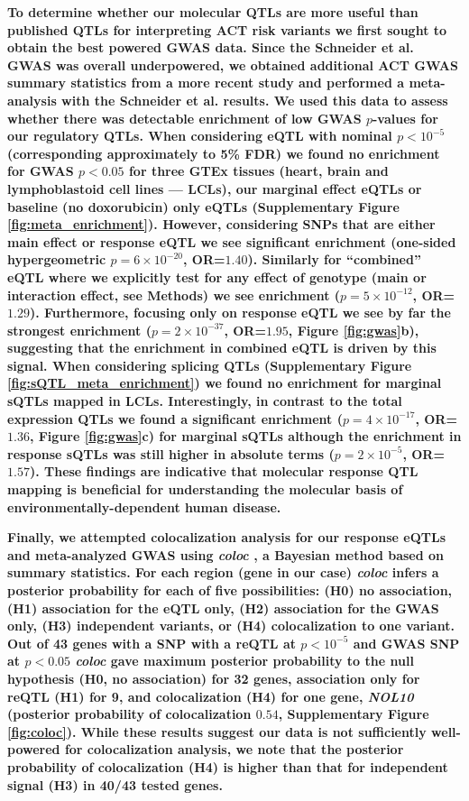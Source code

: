 \documentclass{article}
\newcommand{\tempbold}[1]{\textbf{#1}}
\begin{document}
\tempbold{To determine whether our molecular QTLs are more useful than published QTLs for interpreting ACT risk variants we first sought to obtain the best powered GWAS data. Since the Schneider et al. GWAS was overall underpowered, we obtained additional ACT GWAS summary statistics from a more recent study\cite{Serie2017} and performed a meta-analysis with the Schneider et al. results. We used this data to assess whether there was detectable enrichment of low GWAS $p$-values for our regulatory QTLs. When considering eQTL with nominal $p < 10^{-5}$ (corresponding approximately to 5\% FDR) we found no enrichment for GWAS $p<0.05$ for three GTEx tissues (heart, brain and lymphoblastoid cell lines --- LCLs), our marginal effect eQTLs or baseline (no doxorubicin) only eQTLs (Supplementary Figure \ref{fig:meta_enrichment}). However, considering SNPs that are either main effect or response eQTL we see significant enrichment (one-sided hypergeometric $p=6 \times 10^{-20}$, OR=$1.40$). Similarly for ``combined'' eQTL where we explicitly test for any effect of genotype  (main or interaction effect, see Methods) we see enrichment ($p=5 \times 10^{-12}$, OR=$1.29$). Furthermore, focusing only on response eQTL we see by far the strongest enrichment ($p=2 \times 10^{-37}$, OR=$1.95$, Figure \ref{fig:gwas}b), suggesting that the enrichment in combined eQTL is driven by this signal. When considering splicing QTLs (Supplementary Figure \ref{fig:sQTL_meta_enrichment}) we found no enrichment for marginal sQTLs mapped in LCLs\cite{li2016rna}. Interestingly, in contrast to the total expression QTLs we found a significant enrichment ($p=4 \times 10^{-17}$, OR=$1.36$, Figure \ref{fig:gwas}c) for marginal sQTLs although the enrichment in response sQTLs was still higher in absolute terms ($p=2 \times 10^{-5}$, OR=$1.57$). These findings are indicative that molecular response QTL mapping is beneficial for understanding the molecular basis of environmentally-dependent human disease.}

\tempbold{Finally, we attempted colocalization analysis for our response eQTLs and meta-analyzed GWAS using \emph{coloc} \cite{Giambartolomei2014-ux}, a Bayesian method based on summary statistics. For each region (gene in our case) \emph{coloc} infers a posterior probability for each of five possibilities: (H0) no association, (H1) association for the eQTL only, (H2) association for the GWAS only, (H3) independent variants, or (H4) colocalization to one variant. Out of 43 genes with a SNP with a reQTL at $p<10^{-5}$ and GWAS SNP at $p<0.05$ \emph{coloc} gave maximum posterior probability to the null hypothesis (H0, no association) for 32 genes, association only for reQTL (H1) for 9, and colocalization (H4) for one gene, \emph{NOL10} (posterior probability of colocalization $0.54$, Supplementary Figure \ref{fig:coloc}). While these results suggest our data is not sufficiently well-powered for colocalization analysis, we note that the posterior probability of colocalization (H4) is higher than that for independent signal (H3) in 40/43 tested genes.}
\end{document}
